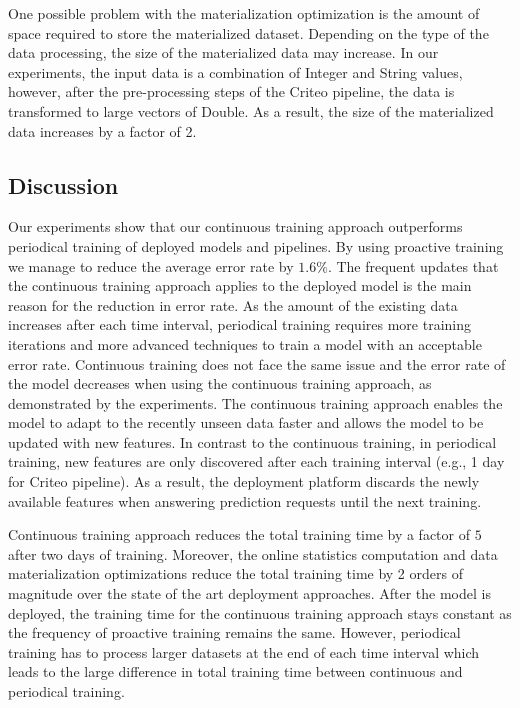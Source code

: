 One possible problem with the materialization optimization is the amount of space required to store the materialized dataset.
Depending on the type of the data processing, the size of the materialized data may increase.
In our experiments, the input data is a combination of Integer and String values, however, after the pre-processing steps of the Criteo pipeline, the data is transformed to large vectors of Double.
As a result, the size of the materialized data increases by a factor of 2.

\subsection{Discussion} \label{subsec:discussion}
Our experiments show that our continuous training approach outperforms periodical training of deployed models and pipelines.
By using proactive training we manage to reduce the average error rate by $1.6\%$.
The frequent updates that the continuous training approach applies to the deployed model is the main reason for the reduction in error rate.
As the amount of the existing data increases after each time interval, periodical training requires more training iterations and more advanced techniques to train a model with an acceptable error rate.
Continuous training does not face the same issue and the error rate of the model decreases when using the continuous training approach, as demonstrated by the experiments.
The continuous training approach enables the model to adapt to the recently unseen data faster and allows the model to be updated with new features.
In contrast to the continuous training, in periodical training, new features are only discovered after each training interval (e.g., 1 day for Criteo pipeline).
As a result, the deployment platform discards the newly available features when answering prediction requests until the next training.

Continuous training approach reduces the total training time by a factor of $5$ after two days of training.
Moreover, the online statistics computation and data materialization optimizations reduce the total training time by 2 orders of magnitude over the state of the art deployment approaches.
After the model is deployed, the training time for the continuous training approach stays constant as the frequency of proactive training remains the same.
However, periodical training has to process larger datasets at the end of each time interval which leads to the large difference in total training time between continuous and periodical training.

